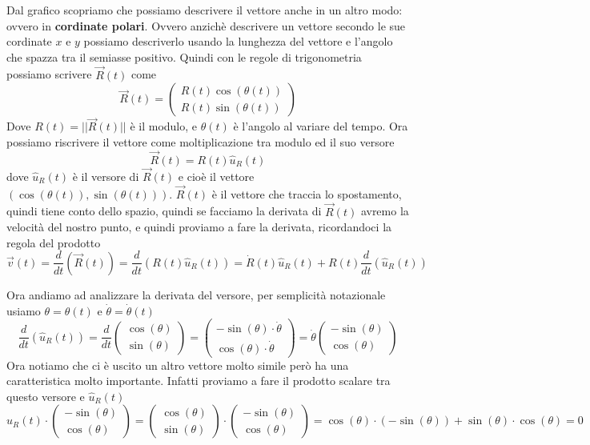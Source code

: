 \documentclass{rapport}
\begin{document}
Dal grafico scopriamo che possiamo descrivere il vettore anche in un altro modo: ovvero in \textbf{cordinate polari}. Ovvero anzichè descrivere un vettore secondo le sue cordinate $x$ e $y$ possiamo descriverlo usando la lunghezza del vettore e l'angolo che spazza tra il semiasse positivo. Quindi con le regole di trigonometria possiamo scrivere $\vec{R}(t)$ come
\[
\vec{R}(t) = \begin{pmatrix}
  R(t) \cos(\theta(t)) \\
R(t) \sin(\theta(t))
\end{pmatrix}
\]
Dove $R(t)= ||\vec{R}(t)||$ è il modulo, e $\theta(t)$ è l'angolo al variare del tempo. Ora possiamo riscrivere il vettore come moltiplicazione tra modulo ed il suo versore
\[
\vec{R}(t) = R(t) \hat{u}_R(t)
\]
dove $\hat{u}_R(t)$ è il versore di $\vec{R}(t)$ e cioè il vettore $(\cos(\theta(t)), \sin(\theta(t)))$. $\vec{R}(t)$ è il vettore che traccia lo spostamento, quindi tiene conto dello spazio, quindi se facciamo la derivata di $\vec{R}(t)$ avremo la velocità del nostro punto, e quindi proviamo a fare la derivata, ricordandoci la regola del prodotto 
\begin{equation}\label{eq:mcu1}
\vec{v}(t)=\dfrac{d}{dt}(\vec{R}(t) ) = \dfrac{d}{dt}( R(t) \hat{u}_R(t)) =  \dot{R}(t) \hat{u}_R(t) +  R(t) \dfrac{d}{dt}\left(\hat{u}_R(t)\right)  
\end{equation}


Ora andiamo ad analizzare la derivata del versore, per semplicità notazionale usiamo  $\theta=\theta(t)$ e $\dot{\theta} = \dot{\theta}(t)$
\[
\dfrac{d}{dt}\left(\hat{u}_R(t)\right) = \dfrac{d}{dt}\begin{pmatrix}
  \cos(\theta) \\
\sin(\theta)
\end{pmatrix} = \begin{pmatrix}
  -\sin(\theta)  \cdot \dot{\theta}\\
\cos(\theta)\cdot \dot{\theta}
\end{pmatrix}=\dot{\theta}\begin{pmatrix}
  -\sin(\theta)\\
\cos(\theta)
\end{pmatrix}
\]
Ora notiamo che ci è uscito un altro vettore molto simile però ha una caratteristica molto importante. Infatti proviamo a fare il prodotto scalare tra questo versore e $\hat{u}_R(t)$
\[
\hat{u}_R(t)\cdot \begin{pmatrix}
  -\sin(\theta)\\
\cos(\theta)
\end{pmatrix} = \begin{pmatrix}
  \cos(\theta)\\
\sin(\theta)
\end{pmatrix}\cdot\begin{pmatrix}
  -\sin(\theta)\\
\cos(\theta)
\end{pmatrix} = \cos(\theta)\cdot(-\sin(\theta)) + \sin(\theta)\cdot \cos(\theta) = 0
\] 
\end{document}
